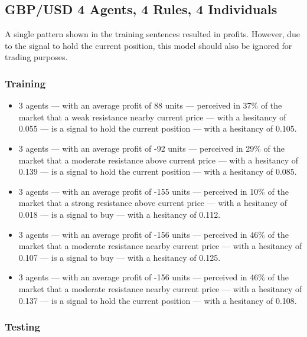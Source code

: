 \subsection{GBP/USD 4 Agents, 4 Rules, 4 Individuals}
\label{}

A single pattern shown in the training sentences resulted in profits. However, due to the signal to hold the current position, this model should also be ignored for trading purposes.

\subsubsection{Training}
\label{}

{\small
  \begin{itemize}
  \item 3 agents — with an average profit of 88 units — perceived in 37\% of the
    market that a weak resistance nearby current price — with a hesitancy of
    0.055 — is a signal to hold the current position — with a hesitancy of
    0.105.
  \item 3 agents — with an average profit of -92 units — perceived in 29\% of
    the market that a moderate resistance above current price — with a hesitancy
    of 0.139 — is a signal to hold the current position — with a hesitancy of
    0.085.
  \item 3 agents — with an average profit of -155 units — perceived in 10\% of
    the market that a strong resistance above current price — with a hesitancy
    of 0.018 — is a signal to buy — with a hesitancy of 0.112.
  \item 3 agents — with an average profit of -156 units — perceived in 46\% of
    the market that a moderate resistance nearby current price — with a
    hesitancy of 0.107 — is a signal to buy — with a hesitancy of 0.125.
  \item 3 agents — with an average profit of -156 units — perceived in 46\% of
    the market that a moderate resistance nearby current price — with a
    hesitancy of 0.137 — is a signal to hold the current position — with a
    hesitancy of 0.108.
  \end{itemize}
}

\subsubsection{Testing}
\label{}

